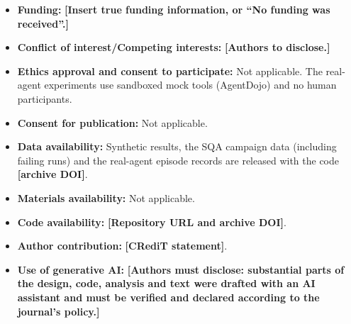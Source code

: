 \documentclass[pdflatex,sn-mathphys-num]{sn-jnl}
\theoremstyle{thmstyleone}
\theoremstyle{thmstyletwo}
\theoremstyle{thmstylethree}
\newcommand{\placeholder}[1]{\textbf{[#1]}}
\begin{document}
\begin{itemize}
\item \textbf{Funding:} \placeholder{Insert true funding information, or ``No funding was received''.}
\item \textbf{Conflict of interest/Competing interests:} \placeholder{Authors to disclose.}
\item \textbf{Ethics approval and consent to participate:} Not applicable. The real-agent experiments use sandboxed mock tools (AgentDojo) and no human participants.
\item \textbf{Consent for publication:} Not applicable.
\item \textbf{Data availability:} Synthetic results, the SQA campaign data (including failing runs) and the real-agent episode records are released with the code \placeholder{archive DOI}.
\item \textbf{Materials availability:} Not applicable.
\item \textbf{Code availability:} \placeholder{Repository URL and archive DOI}.
\item \textbf{Author contribution:} \placeholder{CRediT statement}.
\item \textbf{Use of generative AI:} \placeholder{Authors must disclose: substantial parts of the design, code, analysis and text were drafted with an AI assistant and must be verified and declared according to the journal's policy.}
\end{itemize}


\end{document}
